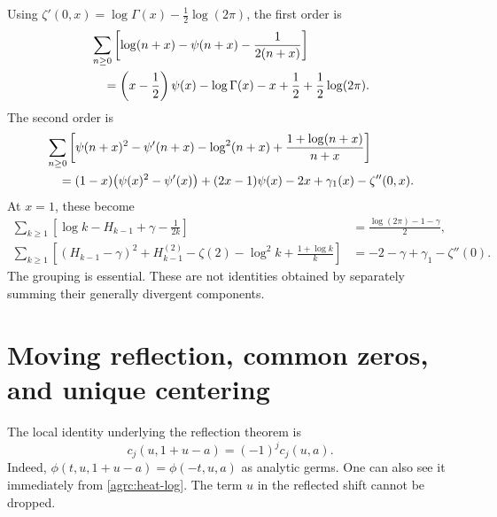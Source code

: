 \documentclass[11pt]{article}
\numberwithin{equation}{section}
\theoremstyle{definition}\newtheorem{definition}[theorem]{Definition}
\theoremstyle{remark}\newtheorem{remark}[theorem]{Remark}
\begin{document}
Using $\zeta'(0,x)=\log\Gamma(x)-\tfrac12\log(2\pi)$, the first order is
\begin{align}
 &\sum_{n\geq0}\left[\log(n+x)-\psi(n+x)-\frac1{2(n+x)}\right]\notag\\
 &\quad=\left(x-\frac12\right)\psi(x)-\log\Gamma(x)-x
                         +\frac12+\frac12\log(2\pi).
 \label{agrc:first-log}
\end{align}
The second order is
\begin{align}
 &\sum_{n\geq0}\left[\psi(n+x)^2-\psi'(n+x)-\log^2(n+x)
                       +\frac{1+\log(n+x)}{n+x}\right]\notag\\
 &\quad=(1-x)\bigl(\psi(x)^2-\psi'(x)\bigr)
     +(2x-1)\psi(x)-2x+\gamma_1(x)-\zeta''(0,x).
 \label{agrc:second-log}
\end{align}
At $x=1$, these become
\begin{align}
 \sum_{k\geq1}\left[\log k-H_{k-1}+\gamma-\frac1{2k}\right]
 &=\frac{\log(2\pi)-1-\gamma}{2},\label{agrc:first-at-one}\\
 \sum_{k\geq1}\left[(H_{k-1}-\gamma)^2+H_{k-1}^{(2)}-\zeta(2)
            -\log^2 k+\frac{1+\log k}{k}\right]
 &=-2-\gamma+\gamma_1-\zeta''(0).
 \label{agrc:second-at-one}
\end{align}
The grouping is essential. These are not identities obtained by
separately summing their generally divergent components.

\section{Moving reflection, common zeros, and unique centering}
\label{agrc:reflection-section}

The local identity underlying the reflection theorem is
\begin{equation}\label{agrc:heat-reflection}
 c_j(u,1+u-a)=(-1)^jc_j(u,a).
\end{equation}
Indeed,
$\phi(t,u,1+u-a)=\phi(-t,u,a)$ as analytic germs. One can also see it
immediately from \eqref{agrc:heat-log}. The term $u$ in the reflected
shift cannot be dropped.
\end{document}
